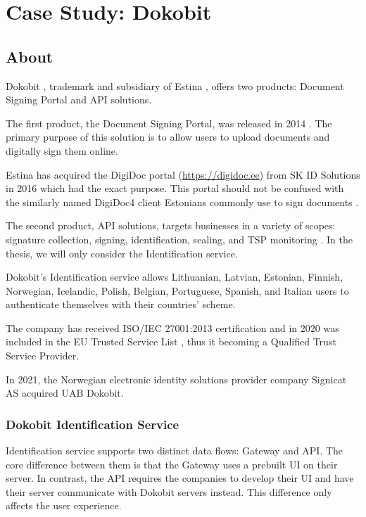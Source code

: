 \section{Case Study: Dokobit}

\subsection{About}

Dokobit \cite{dokobit}, trademark and subsidiary of Estina \cite{euipo-dokobit}, offers two products: Document Signing Portal and API solutions.

The first product, the Document Signing Portal, was released in 2014 \cite{dokobit-aboutus}. The primary purpose of this solution is to allow users to upload documents and digitally sign them online.

Estina has acquired the DigiDoc portal (\url{https://digidoc.ee}) from SK ID Solutions in 2016 \cite{sk-digidocacquired} which had the exact purpose. This portal should not be confused with the similarly named DigiDoc4 client Estonians commonly use to sign documents \cite{ria-idee}.

The second product, API solutions, targets businesses in a variety of scopes: signature collection, signing, identification, sealing, and TSP monitoring \cite{dokobit}. In the thesis, we will only consider the Identification service.

Dokobit's Identification service allows Lithuanian, Latvian, Estonian, Finnish, Norwegian, Icelandic, Polish, Belgian, Portuguese, Spanish, and Italian \cite{dokobit} users to authenticate themselves with their countries' scheme.

The company has received ISO/IEC 27001:2013 certification \cite{dokobit-certification} and in 2020 was included in the EU Trusted Service List \cite{eu-trustservices, dokobit-aboutus}, thus it becoming a Qualified Trust Service Provider.

In 2021, the Norwegian electronic identity solutions provider company Signicat AS acquired UAB Dokobit.

\subsubsection{Dokobit Identification Service}

Identification service supports two distinct data flows: Gateway and API. The core difference between them is that the Gateway uses a prebuilt UI on their server. In contrast, the API requires the companies to develop their UI and have their server communicate with Dokobit servers instead. This difference only affects the user experience.


